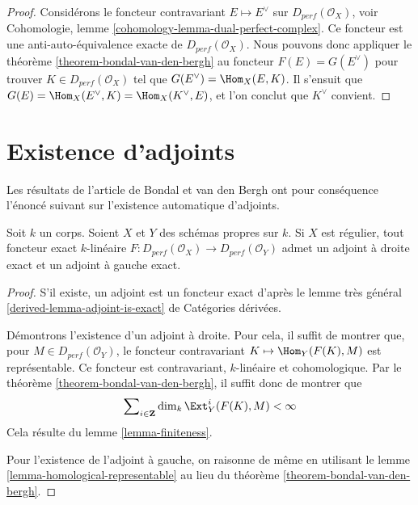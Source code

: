 \begin{proof}
Considérons le foncteur contravariant $E \mapsto E^\vee$
sur $D_{perf}(\mathcal{O}_X)$, voir
Cohomologie, lemme \ref{cohomology-lemma-dual-perfect-complex}.
Ce foncteur est une anti-auto-équivalence exacte de $D_{perf}(\mathcal{O}_X)$.
Nous pouvons donc appliquer le théorème \ref{theorem-bondal-van-den-bergh}
au foncteur $F(E) = G(E^\vee)$ pour trouver
$K \in D_{perf}(\mathcal{O}_X)$ tel que $G(E^\vee) = \Hom_X(E, K)$.
Il s'ensuit que $G(E) = \Hom_X(E^\vee, K) = \Hom_X(K^\vee, E)$,
et l'on conclut que $K^\vee$ convient.
\end{proof}






\section{Existence d'adjoints}
\label{section-adjoints}

\noindent
Les résultats de l'article de Bondal et van den Bergh ont pour conséquence
l'énoncé suivant sur l'existence automatique d'adjoints.

\begin{lemma}
\label{lemma-always-right-adjoints}
Soit $k$ un corps. Soient $X$ et $Y$ des schémas propres sur $k$.
Si $X$ est régulier, tout foncteur exact $k$-linéaire
$F : D_{perf}(\mathcal{O}_X) \to D_{perf}(\mathcal{O}_Y)$
admet un adjoint à droite exact et un adjoint à gauche exact.
\end{lemma}

\begin{proof}
S'il existe, un adjoint est un foncteur exact d'après le lemme très général
\ref{derived-lemma-adjoint-is-exact} de Catégories dérivées.

\medskip\noindent
Démontrons l'existence d'un adjoint à droite.
Pour cela, il suffit de montrer que, pour
$M \in D_{perf}(\mathcal{O}_Y)$, le foncteur contravariant
$K \mapsto \Hom_Y(F(K), M)$ est représentable.
Ce foncteur est contravariant, $k$-linéaire et cohomologique.
Par le théorème \ref{theorem-bondal-van-den-bergh},
il suffit donc de montrer que
$$
\sum\nolimits_{i \in \mathbf{Z}} \dim_k \Ext^i_Y(F(K), M) < \infty
$$
Cela résulte du lemme \ref{lemma-finiteness}.

\medskip\noindent
Pour l'existence de l'adjoint à gauche, on raisonne de même
en utilisant le lemme \ref{lemma-homological-representable}
au lieu du théorème \ref{theorem-bondal-van-den-bergh}.
\end{proof}






